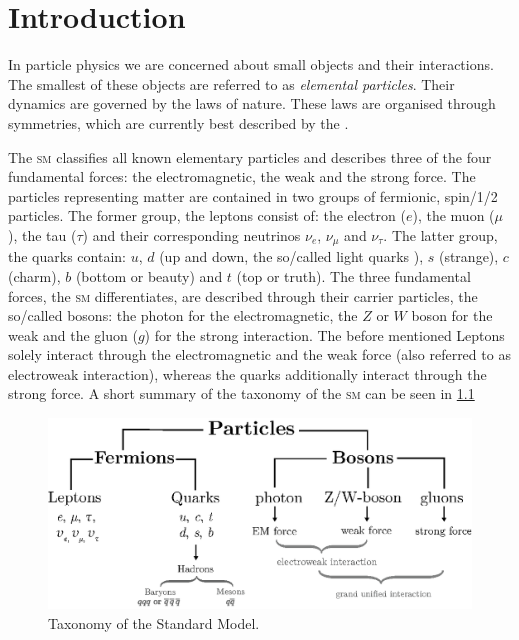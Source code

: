 \documentclass[../../index.tex]{subfiles}
\begin{document}
\chapter{Introduction}
In particle physics we are concerned about small objects and their interactions.
The smallest of these objects are referred to as \textit{elemental particles}.
Their dynamics are governed by the laws of nature. These laws are organised
through symmetries, which are currently best described by the
.

The \textsc{sm} classifies all known elementary particles and describes three of
the four fundamental forces: the electromagnetic, the weak and the strong force. The
particles representing matter are contained in two groups of fermionic,
spin\-/1/2 particles. The former group, the leptons consist of: the electron
(\(e\)), the muon (\(\mu\)), the tau (\(\tau\)) and their corresponding
neutrinos \(\nu_e\), \(\nu_\mu\) and \(\nu_\tau\). The latter group, the quarks
contain: \(u\), \(d\) (up and down, the so\-/called light quarks ), \(s\)
(strange), \(c\) (charm), \(b\) (bottom or beauty) and \(t\) (top or truth). The
three fundamental forces, the \textsc{sm} differentiates, are described through
their carrier particles, the so\-/called bosons: the photon for the
electromagnetic, the \(Z\) or \(W\) boson for the weak and the gluon (\(g\)) for
the strong interaction. The before mentioned Leptons solely interact through the
electromagnetic and the weak force (also referred to as electroweak
interaction), whereas the quarks additionally interact through the strong force.
A short summary of the taxonomy of the \textsc{sm} can be seen in
\cref{fig:SMTaxonomy}
\begin{figure}
  \centering
  \includegraphics[width=\textwidth]{./images/standardModelTaxonomy.eps}
  \caption{Taxonomy of the Standard Model.}
  \label{fig:SMTaxonomy}
\end{figure}
\end{document}
